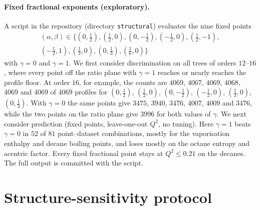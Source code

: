 \documentclass[a5paper, 10pt]{article}
\theoremstyle{plain}
\theoremstyle{remark}
\theoremstyle{definition}
\begin{document}
\paragraph{Fixed fractional exponents (exploratory).} A script in the
repository (directory \texttt{structural}) evaluates the nine fixed
points
\begin{multline*}
(\alpha,\beta) \in \bigl\{(0,\tfrac12), (\tfrac12,0), (0,-\tfrac12),
(-\tfrac12,0), (\tfrac12,-1),\\
(-\tfrac12,1), (\tfrac13,0), (0,\tfrac13), (\tfrac16,0)\bigr\}
\end{multline*}
with $\gamma = 0$ and $\gamma = 1$. We first consider discrimination on
all trees of orders $12$--$16$, where every point off the ratio plane
with $\gamma = 1$ reaches or nearly reaches the profile floor. At order
$16$, for example, the counts are $4069$, $4067$, $4069$, $4068$,
$4069$ and $4069$ of $4069$ profiles for $(0,\tfrac12)$, $(\tfrac12,0)$,
$(0,-\tfrac12)$, $(-\tfrac12,0)$, $(\tfrac13,0)$, $(0,\tfrac13)$. With
$\gamma = 0$ the same points give $3475$, $3940$, $3476$, $4007$,
$4009$ and $3476$, while the two points on the ratio plane give $3996$
for both values of $\gamma$. We next consider prediction (fixed points,
leave-one-out $Q^2$, no tuning). Here $\gamma = 1$ beats $\gamma = 0$
in $52$ of $81$ point--dataset combinations, mostly for the
vaporisation enthalpy and decane boiling points, and loses mostly on
the octane entropy and acentric factor. Every fixed fractional point
stays at $Q^2 \le 0.21$ on the decanes. The full output is committed
with the script.

\section{Structure-sensitivity protocol}\label{sec:s-ss}
\end{document}
